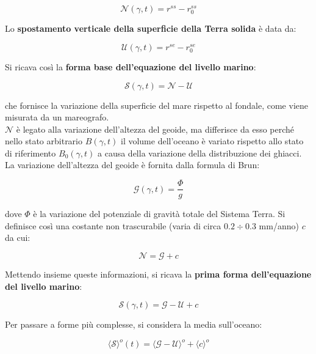 \documentclass[a4paper,12pt]{book}
\begin{document}
\begin{equation}
    \mathcal{N}(\gamma, t) = r^{ss} - r_0^{ss}
\end{equation}

\noindent
Lo \textbf{spostamento verticale della superficie della Terra solida} è data da:

\begin{equation}
    \mathcal{U}(\gamma, t) = r^{se} - r_0^{se}
\end{equation}

\noindent
Si ricava così la \textbf{forma base dell'equazione del livello marino}:

\begin{equation}
    \mathcal{S}(\gamma, t) = \mathcal{N} - \mathcal{U}
\end{equation}

\noindent
che fornisce la variazione della superficie del mare rispetto al fondale, come viene misurata da un mareografo.\\

\noindent
$\mathcal{N}$ è legato alla variazione dell'altezza del geoide, ma differisce da esso perché nello stato arbitrario $B(\gamma, t)$
il volume dell'oceano è variato rispetto allo stato di riferimento $B_0(\gamma, t)$ a causa della variazione della distribuzione dei ghiacci.
La variazione dell'altezza del geoide è fornita dalla formula di Brun:

\begin{equation}
    \mathcal{G}(\gamma,t) = \frac{\Phi}{g}
\end{equation}

\noindent
dove $\Phi$ è la variazione del potenziale di gravità totale del Sistema Terra.
Si definisce così una costante non trascurabile (varia di circa $0.2 \div 0.3$ mm/anno) $c$ da cui:

\begin{equation}
    \mathcal{N} = \mathcal{G} + c
\end{equation}

\noindent Mettendo insieme queste informazioni, si ricava la \textbf{prima forma dell'equazione del livello marino}:

\begin{equation}
    \mathcal{S}(\gamma, t) = \mathcal{G} - \mathcal{U} + c
\end{equation}

\noindent Per passare a forme più complesse, si considera la media sull'oceano:

\begin{equation}
    \langle \mathcal{S} \rangle ^o (t) = \langle \mathcal{G} - \mathcal{U} \rangle^o + \langle c \rangle^o
\end{equation}
\end{document}
